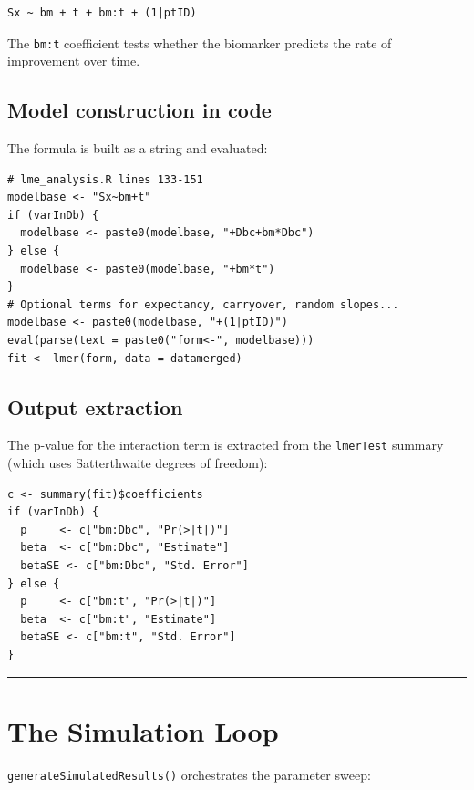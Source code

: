 \documentclass[11pt]{article}
\begin{document}
\begin{verbatim}
Sx ~ bm + t + bm:t + (1|ptID)
\end{verbatim}

The \texttt{bm:t} coefficient tests whether the biomarker predicts the
rate of improvement over time.

\subsection{Model construction in code}

The formula is built as a string and evaluated:

\begin{lstlisting}
# lme_analysis.R lines 133-151
modelbase <- "Sx~bm+t"
if (varInDb) {
  modelbase <- paste0(modelbase, "+Dbc+bm*Dbc")
} else {
  modelbase <- paste0(modelbase, "+bm*t")
}
# Optional terms for expectancy, carryover, random slopes...
modelbase <- paste0(modelbase, "+(1|ptID)")
eval(parse(text = paste0("form<-", modelbase)))
fit <- lmer(form, data = datamerged)
\end{lstlisting}

\subsection{Output extraction}

The p-value for the interaction term is extracted from the
\texttt{lmerTest} summary (which uses Satterthwaite degrees of freedom):

\begin{lstlisting}
c <- summary(fit)$coefficients
if (varInDb) {
  p     <- c["bm:Dbc", "Pr(>|t|)"]
  beta  <- c["bm:Dbc", "Estimate"]
  betaSE <- c["bm:Dbc", "Std. Error"]
} else {
  p     <- c["bm:t", "Pr(>|t|)"]
  beta  <- c["bm:t", "Estimate"]
  betaSE <- c["bm:t", "Std. Error"]
}
\end{lstlisting}

\bigskip\noindent\rule{\textwidth}{0.4pt}\bigskip

\section{The Simulation Loop}

\texttt{generateSimulatedResults()} orchestrates the parameter sweep:
\end{document}
